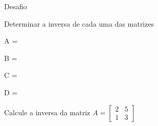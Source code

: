 \begin{exercicios}{Desafio}
    
    \begin{exercicio}
        Determinar a inversa de cada uma das matrizes
        \begin{mathlist}[2]
        \item A = \left[\begin{array}{rr}
            5 & 6 \\ 
            4 & 5
        \end{array} \right]
        \item B = \left[\begin{array}{rr}
            2 & 5 \\ 
            1 & 3
        \end{array} \right]
        \item C = \left[\begin{array}{rr}
            1 & 0 \\ 
            0 & 2
        \end{array} \right]
        \item D = \left[\begin{array}{rr}
            1 & -1  \\ 
            1 &  1
        \end{array} \right]
        \end{mathlist}
    \end{exercicio}
    
    \begin{exercicio}
        Calcule a inversa da matriz
        \( A = \left[\begin{array}{cc}
        2 & 5 \\
        1 & 3
        \end{array} \right] \)
    \end{exercicio}
    

\end{exercicios}
